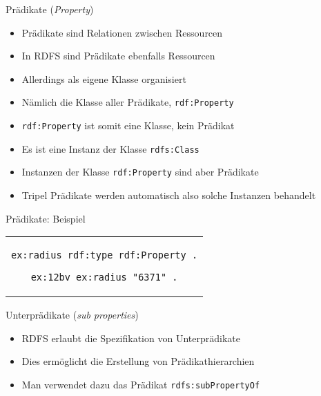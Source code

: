 \documentclass{beamer}
\begin{document}
\begin{frame}{Prädikate (\emph{Property})}
	
	\begin{itemize}
		\item Prädikate sind Relationen zwischen Ressourcen
		\item In RDFS sind Prädikate ebenfalls Ressourcen
		\item Allerdings als eigene Klasse organisiert
		\item Nämlich die Klasse aller Prädikate, \texttt{rdf:Property}
		\item \texttt{rdf:Property} ist somit eine Klasse, kein Prädikat
		\item Es ist eine Instanz der Klasse \texttt{rdfs:Class}
		\item Instanzen der Klasse \texttt{rdf:Property} sind aber Prädikate
		\item Tripel Prädikate werden automatisch also solche Instanzen behandelt
	\end{itemize}
	
\end{frame}

\begin{frame}[fragile]{Prädikate: Beispiel}
	
	\begin{center}
		\begin{tabular}{c}
			\begin{lstlisting}
ex:radius rdf:type rdf:Property .

ex:12bv ex:radius "6371" .
			\end{lstlisting}
		\end{tabular}
	\end{center}
	
\end{frame}

\begin{frame}{Unterprädikate (\emph{sub properties})}
	
	\begin{itemize}
		\item RDFS erlaubt die Spezifikation von Unterprädikate
		\item Dies ermöglicht die Erstellung von Prädikathierarchien
		\item Man verwendet dazu das Prädikat \texttt{rdfs:subPropertyOf}
	\end{itemize}
	
\end{frame}
\end{document}
